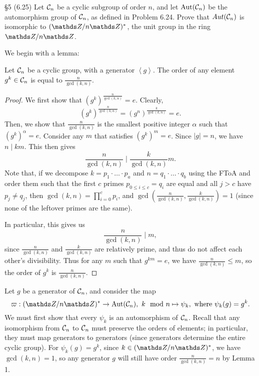 \documentclass{homework}
\begin{document}
\begin{problem}{\S 5}
  (6.25) Let $\mathcal{C}_n$ be a cyclic subgroup of order $n$, and let $\operatorname{Aut}(\mathcal{C}_n)$ be the
  automorphism group of $\mathcal{C}_n$, as defined in Problem 6.24. Prove that $Aut(\mathcal{C}_n)$ is
  isomorphic to $(\Z / n\Z)^*$, the unit group in the ring $\Z / n\Z$.
\end{problem}
\begin{solution}
  We begin with a lemma:
  \begin{lemma}[]{}
    Let $\mathcal{C}_n$ be a cyclic group, with a generator $\left<g \right> $. The order of any element
    $g^k\in \mathcal{C}_n$ is equal to $\frac{n}{\gcd{(k,n)}}$.
  \end{lemma}
  \begin{proof}[Proof]
    We first show that $(g^k)^{\frac{n}{\gcd{(k,n)}}}=e$. Clearly, \[
      (g^k)^{\frac{n}{\gcd{(k,n)}}}=(g^n)^{\frac{k}{\gcd{(k,n)}}}=e
    .\] Then, we show that ${\frac{n}{\gcd{(k,n)}}}$ is the smallest positive integer $\alpha$ such
    that $(g^k)^\alpha=e$. Consider any $m$ that satisfies $(g^k)^m=e$. Since $\left| g \right| =n$,
    we have $n\mid km$. This then gives \[
      \frac{n}{\gcd{(k,n)}}\mid \frac{k}{\gcd{(k,n)}}m
    .\] Note that, if we decompose $k=p_1\cdot \ldots\cdot p_a$ and $n=q_1\cdot \ldots\cdot q_b$
    using the FToA and order them such that the first $c$ primes $p_{0\le i\le c}=q_{i}$ are equal
    and all $j>c$ have $p_j\neq q_j$, then $\gcd{(k,n)}=\prod_{i=0}^{c} p_i$, and
    $\gcd{(\frac{n}{\gcd{(k,n)}},\frac{k}{\gcd{(k,n)}})}=1$ (since none of the leftover primes are
    the same).

    In particular, this gives us \[
      \frac{n}{\gcd{(k,n)}}\mid m
    ,\] since $\frac{n}{\gcd{(k,n)}}$ and $\frac{k}{\gcd{(k,n)}}$ are relatively prime, and thus do
    not affect each other's divisibility. Thus for any $m$ such that $g^{km}=e$, we have
    $\frac{n}{\gcd{(k,n)}}\le m$, so the order of $g^k$ is $\frac{n}{\gcd{(k,n)}}$.
  \end{proof}
  
  
  Let $g$ be a generator of $\mathcal{C}_n$, and consider the map \[
    \varpi: (\Z / n\Z)^* \to \Aut(\mc{C}_n),\ k\mod{n}\mapsto \psi_k,~\text{where}~\psi_k(g)=g^k
  .\] We must first show that every $\psi_k$ is an automorphism of $\mathcal{C}_n$. Recall that any
  isomorphism from $\mathcal{C}_n$ to $\mathcal{C}_n$ must preserve the orders of elements; in particular,
  they must map generators to generators (since generators determine the entire cyclic group). For
  $\psi_k(g)=g^k$, since $k\in (\Z / n\Z)^*$, we have $\gcd{(k,n)}=1$, so any generator $g$ will
  still have order $\frac{n}{\gcd{(k,n)}}=n$ by Lemma 1.


\end{solution}
\end{document}
